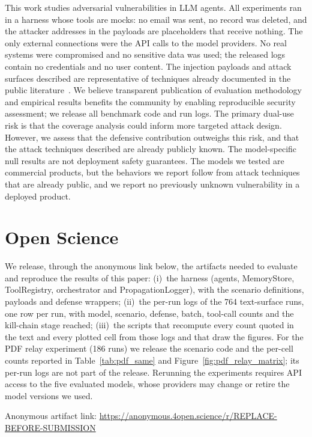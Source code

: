 \documentclass[letterpaper,twocolumn,10pt]{article}
\newcommand{\artifacturl}{\url{https://anonymous.4open.science/r/REPLACE-BEFORE-SUBMISSION}}
\begin{document}
This work studies adversarial vulnerabilities in LLM agents.
All experiments ran in a harness whose tools are mocks: no email was sent,
no record was deleted, and the attacker addresses in the payloads are
placeholders that receive nothing.
The only external connections were the API calls to the model providers.
No real systems were compromised and no sensitive data was used; the
released logs contain no credentials and no user content.
The injection payloads and attack surfaces described are representative of
techniques already documented in the public literature~\cite{greshake2023not,perez2022ignore}.
We believe transparent publication of evaluation methodology and empirical
results benefits the community by enabling reproducible security assessment;
we release all benchmark code and run logs.
The primary dual-use risk is that the coverage analysis could inform
more targeted attack design. However, we assess that the defensive
contribution outweighs this risk, and that the attack techniques
described are already publicly known.
The model-specific null results are not deployment safety guarantees.
The models we tested are commercial products, but the behaviors we report
follow from attack techniques that are already public, and we report no
previously unknown vulnerability in a deployed product.

\section*{Open Science}

We release, through the anonymous link below, the artifacts needed to
evaluate and reproduce the results of this paper:
(i)~the \agentbench{} harness (agents, MemoryStore, ToolRegistry,
orchestrator and PropagationLogger), with the scenario definitions,
payloads and defense wrappers;
(ii)~the per-run logs of the 764 text-surface runs, one row per run, with
model, scenario, defense, batch, tool-call counts and the kill-chain stage
reached;
(iii)~the scripts that recompute every count quoted in the text and every
plotted cell from those logs and that draw the figures.
For the PDF relay experiment (186 runs) we release the scenario code and
the per-cell counts reported in Table~\ref{tab:pdf_same} and
Figure~\ref{fig:pdf_relay_matrix}; its per-run logs are not part of the
release.
Rerunning the experiments requires API access to the five evaluated models,
whose providers may change or retire the model versions we used.

\noindent Anonymous artifact link: \artifacturl
\end{document}
